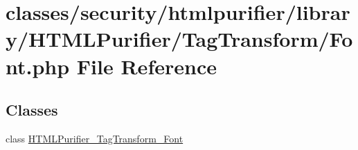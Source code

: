 \hypertarget{TagTransform_2Font_8php}{\section{classes/security/htmlpurifier/library/\+H\+T\+M\+L\+Purifier/\+Tag\+Transform/\+Font.php File Reference}
\label{TagTransform_2Font_8php}
}
\subsection*{Classes}
\begin{DoxyCompactItemize}
\item 
class \hyperlink{classHTMLPurifier__TagTransform__Font}{H\+T\+M\+L\+Purifier\+\_\+\+Tag\+Transform\+\_\+\+Font}
\end{DoxyCompactItemize}
